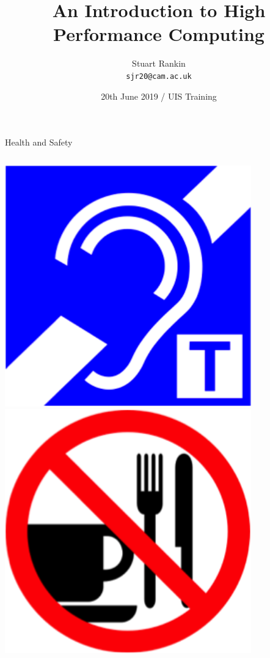 \documentclass{beamer}
\title[HPC: An introduction] %
{An Introduction to High Performance Computing}
\author[SJ Rankin] %
{Stuart Rankin\\ \texttt{sjr20@cam.ac.uk}}
\institute[Research Computing Services, University of Cambridge] %
{Research Computing Services (http://www.hpc.cam.ac.uk/)\\
University Information Services (http://www.uis.cam.ac.uk/)}
\date[20/06/2019] %
{20th June 2019 / UIS Training}
\begin{document}
\begin{frame}
  \titlepage
\end{frame}

\begin{frame}{Health and Safety}
\begin{columns}[c]
\begin{column}{0.33\textwidth}
\begin{center}
\includegraphics[width=0.8\textwidth,height=0.5\textheight,keepaspectratio]{imgs/health-safety-1.png}\\
\includegraphics[width=0.8\textwidth,height=0.5\textheight,keepaspectratio]{imgs/health-safety-4.png}

\end{center}
\end{column}
\end{columns}
\end{frame}
\end{document}

